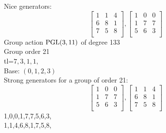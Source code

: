 Nice generators:\\
$$
\left[
\begin{array}{*{3}{r}}
1 & 1 & 4\\
6 & 8 & 1\\
7 & 5 & 8\\
\end{array}
\right]
, 
\left[
\begin{array}{*{3}{r}}
1 & 0 & 0\\
1 & 7 & 7\\
5 & 6 & 3\\
\end{array}
\right]
$$
Group action ${\rm PGL}(3,11)$ of degree 133\\
Group order 21\\
tl=$7, 3, 1, 1, $\\
Base: $( 0, 1, 2, 3 )$\\
{\small\arraycolsep=2pt
Strong generators for a group of order 21:
$$
\left[
\begin{array}{*{3}{r}}
1 & 0 & 0\\
1 & 7 & 7\\
5 & 6 & 3\\
\end{array}
\right]
, 
\left[
\begin{array}{*{3}{r}}
1 & 1 & 4\\
6 & 8 & 1\\
7 & 5 & 8\\
\end{array}
\right]
$$
1,0,0,1,7,7,5,6,3,\\
1,1,4,6,8,1,7,5,8,\\
}
